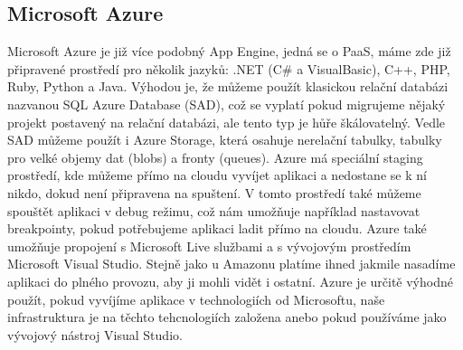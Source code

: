 \subsection{Microsoft Azure}
Microsoft Azure je již více podobný App Engine, jedná se o PaaS, máme zde již připravené prostředí pro několik jazyků: .NET (C\# a VisualBasic), C++, PHP, Ruby, Python a Java. Výhodou je, že můžeme použít klasickou relační databázi nazvanou SQL Azure Database (SAD), což se vyplatí pokud migrujeme nějaký projekt postavený na relační databázi, ale tento typ je hůře škálovatelný. Vedle SAD můžeme použít i Azure Storage, která osahuje nerelační tabulky, tabulky pro velké objemy dat (blobs) a fronty (queues). Azure má speciální staging prostředí, kde můžeme přímo na cloudu vyvíjet aplikaci a nedostane se k ní nikdo, dokud není připravena na spuštení. V tomto prostředí také můžeme spouštět aplikaci v debug režimu, což nám umožňuje například nastavovat breakpointy, pokud potřebujeme aplikaci ladit přímo na cloudu. Azure také umožňuje propojení s Microsoft Live službami a s vývojovým prostředím Microsoft Visual Studio. Stejně jako u Amazonu platíme ihned jakmile nasadíme aplikaci do plného provozu, aby ji mohli vidět i ostatní. Azure je určitě výhodné použít, pokud vyvíjíme aplikace v technologiích od Microsoftu, naše infrastruktura je na těchto tehcnologiích založena anebo pokud používáme jako vývojový nástroj Visual Studio.

